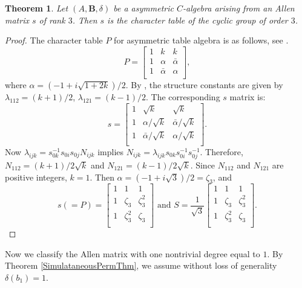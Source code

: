 \documentclass[12pt]{amsart}
\newtheorem{thm}{Theorem}
\begin{document}
\begin{thm}\label{t9}
Let $(A,{{\mathbf B}}, \delta)$ be a asymmetric $C$-algebra arising from an Allen matrix $s$ of rank $3$. Then $s$ is the character table of the cyclic group of order $3$.
\end{thm}

\begin{proof}
The character table $P$ for asymmetric table algebra is as follows, see \cite[\S 4]{HRB}.
$$P=\left[
   \begin{array}{ccc}
     1 & k & k \\
      1 & \alpha & \bar\alpha \\
     1 & \bar\alpha & \alpha\\
    \end{array}
 \right],$$
where $\alpha={(-1+i\sqrt{1+2k})}/{2}.$
By \cite[Theorem 3.3]{HRB}, the structure constants are given by $\lambda_{112} =(k+1)/2$,
$\lambda_{121}= (k-1)/2$. The corresponding $s$ matrix is:
$$s=\left[
   \begin{array}{ccc}
     1 & \sqrt{k} & \sqrt{k} \\
      1 & {\alpha}/{\sqrt{k}} &  {\bar\alpha}/{\sqrt{k}} \\
     1 &  {\bar\alpha}/{\sqrt{k}} &  {\alpha}/{\sqrt{k}}\\
    \end{array}
 \right].
$$
Now $\lambda_{ijk}=  {s^{-1}_{0k}}{s_{0i}s_{0j}N_{ijk}}$ implies $N_{ijk}= {\lambda_{ijk}s_{0k}}{s^{-1}_{0i}s^{-1}_{0j}}$.
Therefore, $N_{112}= ({k+1})/{2\sqrt{k}}$ and
$N_{121}= ({k-1})/{2\sqrt{k}}$. Since $N_{112}$ and $N_{121}$ are positive integers,  $k=1$. Then $\alpha=(-1+i\sqrt{3})/2=\zeta_3$, and
$$s(=P)=\left[
   \begin{array}{ccc}
     1 & 1 & 1 \\
      1 & \zeta_3 & \zeta^2_3 \\
     1 & \zeta^2_3 & \zeta_3\\
    \end{array}
 \right]\mbox{ and }S=\dfrac{1}{\sqrt3}\left[
   \begin{array}{ccc}
     1 & 1 & 1 \\
      1 & \zeta_3 & \zeta^2_3 \\
     1 & \zeta^2_3 & \zeta_3\\
    \end{array}
 \right]
.$$
\end{proof}

Now we classify the Allen matrix with one nontrivial degree equal to $1$. By Theorem \ref{SimulataneousPermThm}, we assume without loss of generality $\delta(b_1)=1$.
\end{document}
